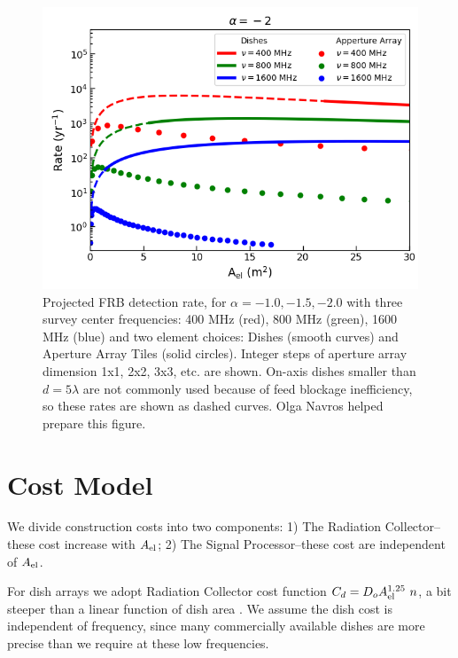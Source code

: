 \documentclass[fleqn,usenatbib]{mnras}
\begin{document}
\begin{figure}
   \includegraphics[width=1\linewidth,height=0.82\linewidth]{ratevsaeff_alpha2.png}

\caption[Two numerical solutions]{Projected FRB detection rate, for $\alpha=-1.0, -1.5, -2.0$ with three survey center frequencies: 400 MHz (red), 800 MHz (green), 1600 MHz (blue) and two element choices: Dishes (smooth curves) and Aperture Array Tiles (solid circles).   Integer steps of aperture array dimension 1x1, 2x2, 3x3, etc. are shown.
   On-axis dishes smaller than $ d= 5 \lambda$ are not commonly used because of feed blockage inefficiency, so these rates are shown as dashed curves. Olga Navros helped prepare this figure.}
\end{figure}

\section{Cost Model}

We divide construction costs into two components: 1) The Radiation Collector--these cost increase with $A_{\rm{el}}$; 2) The Signal Processor--these cost are independent of $A_{\rm{el}}$. 

For dish arrays we adopt Radiation Collector cost function $C_d = D_o A_{\rm{el}}^{1.25} ~n $, a bit steeper than a linear function of dish area \citep{10.1117/12.552181}.
We assume the dish cost is independent of frequency, since many commercially available dishes are more precise than we require at these low frequencies.
\end{document}
